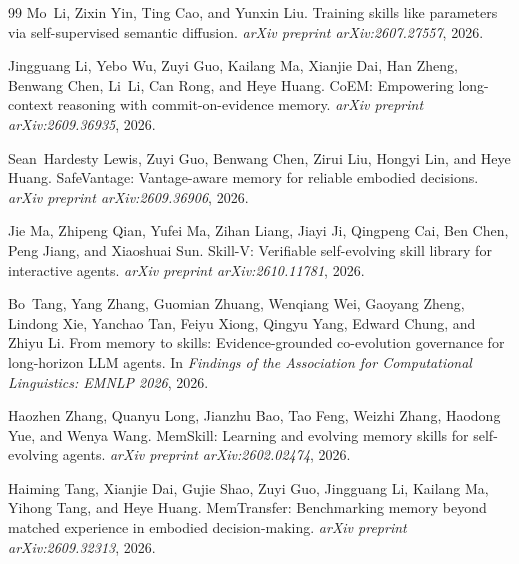 \documentclass[11pt,a4paper]{article}
\begin{document}
\begin{thebibliography}{99}
Mo~Li, Zixin Yin, Ting Cao, and Yunxin Liu.
\newblock Training skills like parameters via self-supervised semantic diffusion.
\newblock \emph{arXiv preprint arXiv:2607.27557}, 2026.

Jingguang Li, Yebo Wu, Zuyi Guo, Kailang Ma, Xianjie Dai, Han Zheng, Benwang Chen, Li~Li, Can Rong, and Heye Huang.
\newblock CoEM: Empowering long-context reasoning with commit-on-evidence memory.
\newblock \emph{arXiv preprint arXiv:2609.36935}, 2026.

Sean~Hardesty Lewis, Zuyi Guo, Benwang Chen, Zirui Liu, Hongyi Lin, and Heye Huang.
\newblock SafeVantage: Vantage-aware memory for reliable embodied decisions.
\newblock \emph{arXiv preprint arXiv:2609.36906}, 2026.

Jie Ma, Zhipeng Qian, Yufei Ma, Zihan Liang, Jiayi Ji, Qingpeng Cai, Ben Chen, Peng Jiang, and Xiaoshuai Sun.
\newblock Skill-V: Verifiable self-evolving skill library for interactive agents.
\newblock \emph{arXiv preprint arXiv:2610.11781}, 2026.

Bo~Tang, Yang Zhang, Guomian Zhuang, Wenqiang Wei, Gaoyang Zheng, Lindong Xie, Yanchao Tan, Feiyu Xiong, Qingyu Yang, Edward Chung, and Zhiyu Li.
\newblock From memory to skills: Evidence-grounded co-evolution governance for long-horizon LLM agents.
\newblock In \emph{Findings of the Association for Computational Linguistics: EMNLP 2026}, 2026.

Haozhen Zhang, Quanyu Long, Jianzhu Bao, Tao Feng, Weizhi Zhang, Haodong Yue, and Wenya Wang.
\newblock MemSkill: Learning and evolving memory skills for self-evolving agents.
\newblock \emph{arXiv preprint arXiv:2602.02474}, 2026.

Haiming Tang, Xianjie Dai, Gujie Shao, Zuyi Guo, Jingguang Li, Kailang Ma, Yihong Tang, and Heye Huang.
\newblock MemTransfer: Benchmarking memory beyond matched experience in embodied decision-making.
\newblock \emph{arXiv preprint arXiv:2609.32313}, 2026.

\end{thebibliography}
\end{document}

